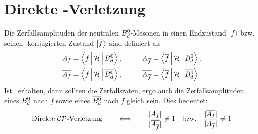 \section[Direkte \CP-Verletzung]{Direkte \boldmath\CP-Verletzung\unboldmath}
Die Zerfallsamplituden der neutralen $\text{$B_d^0$}$-Mesonen in einen Endzustand $\Ket{f}$ bzw. seinen \CP-konjugierten Zustand $\Ket{\overline{f}}$ sind definiert als
\begin{alignat}{2}
\nonumber A_f &= \Braket{f|\mathcal{H}|\text{\Bd}\vphantom{\text{\Bdbar}}}, && \qquad A_{\overline{f}} = \Braket{\overline{f}|\mathcal{H}|\text{\Bd}\vphantom{\text{\Bdbar}}}, \\
          \overline{A_f} &= \Braket{f|\mathcal{H}|\text{\Bdbar}}, && \qquad  \overline{A_{\overline{f}}} = \Braket{\overline{f}|\mathcal{H}|\text{\Bdbar}}. \label{eq:decay_amplitudes}
\end{alignat}
Ist \CP\ erhalten, dann sollten die Zerfallsraten, ergo auch die Zerfallsamplituden eines $\text{$B_d^0$}$ nach $f$ sowie eines $\text{$\overline{B_d^0}$}$ nach $\overline{f}$ gleich sein. Dies bedeutet:
\begin{align}
\text{Direkte $\mathcal{CP}$-Verletzung} \qquad \Longleftrightarrow \qquad \frac{|A_f|}{|\overline{A_{\overline{f}}}|} \neq 1 \quad \text{bzw.} \quad \frac{|\overline{A_f}|}{|A_{\overline{f}}|} \neq 1
\end{align}


